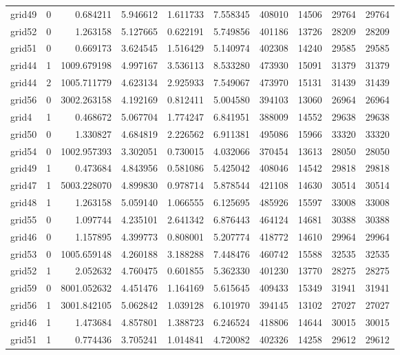 \begin{longtable}{|l|r|r|r|r|r|r|r|r|r|}
grid49 & 0 & 0.684211 & 5.946612 & 1.611733 & 7.558345 & 408010 & 14506 & 29764 & 29764 \\
grid52 & 0 & 1.263158 & 5.127665 & 0.622191 & 5.749856 & 401186 & 13726 & 28209 & 28209 \\
grid51 & 0 & 0.669173 & 3.624545 & 1.516429 & 5.140974 & 402308 & 14240 & 29585 & 29585 \\
grid44 & 1 & 1009.679198 & 4.997167 & 3.536113 & 8.533280 & 473930 & 15091 & 31379 & 31379 \\
grid44 & 2 & 1005.711779 & 4.623134 & 2.925933 & 7.549067 & 473970 & 15131 & 31439 & 31439 \\
grid56 & 0 & 3002.263158 & 4.192169 & 0.812411 & 5.004580 & 394103 & 13060 & 26964 & 26964 \\
grid4 & 1 & 0.468672 & 5.067704 & 1.774247 & 6.841951 & 388009 & 14552 & 29638 & 29638 \\
grid50 & 0 & 1.330827 & 4.684819 & 2.226562 & 6.911381 & 495086 & 15966 & 33320 & 33320 \\
grid54 & 0 & 1002.957393 & 3.302051 & 0.730015 & 4.032066 & 370454 & 13613 & 28050 & 28050 \\
grid49 & 1 & 0.473684 & 4.843956 & 0.581086 & 5.425042 & 408046 & 14542 & 29818 & 29818 \\
grid47 & 1 & 5003.228070 & 4.899830 & 0.978714 & 5.878544 & 421108 & 14630 & 30514 & 30514 \\
grid48 & 1 & 1.263158 & 5.059140 & 1.066555 & 6.125695 & 485926 & 15597 & 33008 & 33008 \\
grid55 & 0 & 1.097744 & 4.235101 & 2.641342 & 6.876443 & 464124 & 14681 & 30388 & 30388 \\
grid46 & 0 & 1.157895 & 4.399773 & 0.808001 & 5.207774 & 418772 & 14610 & 29964 & 29964 \\
grid53 & 0 & 1005.659148 & 4.260188 & 3.188288 & 7.448476 & 460742 & 15588 & 32535 & 32535 \\
grid52 & 1 & 2.052632 & 4.760475 & 0.601855 & 5.362330 & 401230 & 13770 & 28275 & 28275 \\
grid59 & 0 & 8001.052632 & 4.451476 & 1.164169 & 5.615645 & 409433 & 15349 & 31941 & 31941 \\
grid56 & 1 & 3001.842105 & 5.062842 & 1.039128 & 6.101970 & 394145 & 13102 & 27027 & 27027 \\
grid46 & 1 & 1.473684 & 4.857801 & 1.388723 & 6.246524 & 418806 & 14644 & 30015 & 30015 \\
grid51 & 1 & 0.774436 & 3.705241 & 1.014841 & 4.720082 & 402326 & 14258 & 29612 & 29612 \\

\end{longtable}
